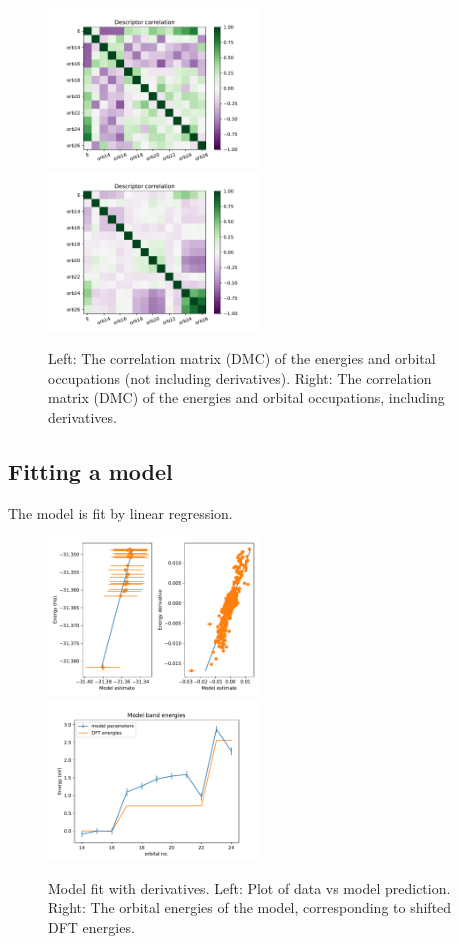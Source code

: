 \begin{figure}[h!]
\includegraphics[width=0.5\textwidth]{images/dmc_lowen_corrmat.pdf}
\includegraphics[width=0.5\textwidth]{images/dmc_allderivs_lowen_corrmat.pdf}
\label{fig:descriptors_corrmat}
\caption{
Left: The correlation matrix (DMC) of the energies and orbital occupations (not including derivatives). 
Right: The correlation matrix (DMC) of the energies and orbital occupations, including derivatives.}
\end{figure}

\subsection{Fitting a model}

The model is fit by linear regression.

\begin{figure}[h!]
\includegraphics[width=0.5\textwidth]{images/dmc_allderivs_lowen_model.pdf}
\includegraphics[width=0.5\textwidth]{images/dmc_allderivs_lowen_model_bands.pdf}
\label{fig:model_fit}
\caption{Model fit with derivatives. 
Left: Plot of data vs model prediction. 
Right: The orbital energies of the model, corresponding to shifted DFT energies.}
\end{figure}

  
  






